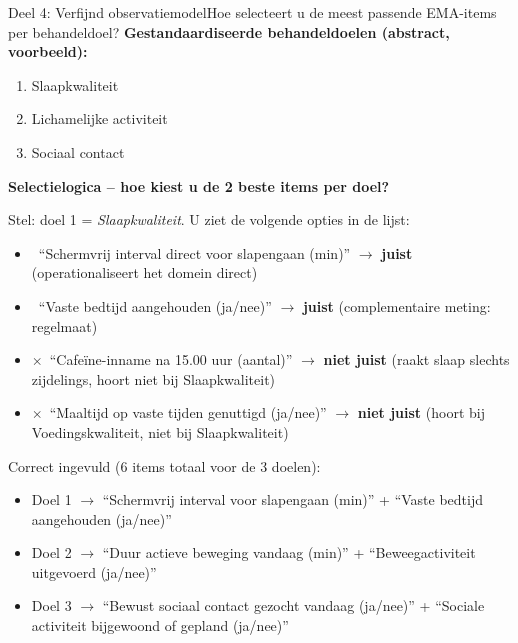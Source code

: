 \documentclass[11pt,a4paper]{article}
\begin{document}
\begin{voorbeeldbox}{Deel 4: Verfijnd observatiemodel}{Hoe selecteert u de meest passende EMA-items per behandeldoel?}
\small
\textbf{Gestandaardiseerde behandeldoelen (abstract, voorbeeld):}
\begin{enumerate}[topsep=2pt,itemsep=1pt,label=\arabic*.]
\item Slaapkwaliteit
\item Lichamelijke activiteit
\item Sociaal contact
\end{enumerate}

\textbf{Selectielogica -- hoe kiest u de 2 beste items per doel?}

Stel: doel 1 = \textit{Slaapkwaliteit}. U ziet de volgende opties in de lijst:
\begin{itemize}[topsep=2pt,itemsep=1pt]
\item \checkmark\ ``Schermvrij interval direct voor slapengaan (min)'' $\rightarrow$ \textbf{juist} (operationaliseert het domein direct)
\item \checkmark\ ``Vaste bedtijd aangehouden (ja/nee)'' $\rightarrow$ \textbf{juist} (complementaire meting: regelmaat)
\item $\times$\ ``Cafeïne-inname na 15.00 uur (aantal)'' $\rightarrow$ \textbf{niet juist} (raakt slaap slechts zijdelings, hoort niet bij Slaapkwaliteit)
\item $\times$\ ``Maaltijd op vaste tijden genuttigd (ja/nee)'' $\rightarrow$ \textbf{niet juist} (hoort bij Voedingskwaliteit, niet bij Slaapkwaliteit)
\end{itemize}

\medskip
Correct ingevuld (6 items totaal voor de 3 doelen):
\begin{itemize}[topsep=1pt,itemsep=0pt]
\item Doel 1 $\rightarrow$ ``Schermvrij interval voor slapengaan (min)'' + ``Vaste bedtijd aangehouden (ja/nee)''
\item Doel 2 $\rightarrow$ ``Duur actieve beweging vandaag (min)'' + ``Beweegactiviteit uitgevoerd (ja/nee)''
\item Doel 3 $\rightarrow$ ``Bewust sociaal contact gezocht vandaag (ja/nee)'' + ``Sociale activiteit bijgewoond of gepland (ja/nee)''
\end{itemize}
\end{voorbeeldbox}

\vspace{0.5em}
\end{document}
